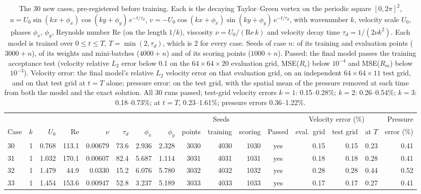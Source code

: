 \begin{table}[tb]
\centering
\footnotesize
\setlength{\tabcolsep}{4pt}
\caption{The 30 new cases, pre-registered before training. Each is the decaying Taylor--Green vortex on the periodic square $[0, 2\pi]^2$, $u = U_0 \sin(kx + \phi_x)\cos(ky + \phi_y)\,e^{-t/\tau_d}$, $v = -U_0 \cos(kx + \phi_x)\sin(ky + \phi_y)\,e^{-t/\tau_d}$, with wavenumber $k$, velocity scale $U_0$, phases $\phi_x$, $\phi_y$, Reynolds number Re (on the length $1/k$), viscosity $\nu = U_0/(\mathrm{Re}\,k)$ and velocity decay time $\tau_d = 1/(2\nu k^2)$. Each model is trained over $0 \le t \le T$, $T = \min(2, \tau_d)$, which is 2 for every case. Seeds of case $n$: of its training and evaluation points ($3000 + n$), of its weights and mini-batches ($4000 + n$) and of its scoring points ($1000 + n$). Passed: the final model passes the training acceptance test (velocity relative $L_2$ error below 0.1 on the $64\times64\times20$ evaluation grid, MSE($R_c$) below $10^{-4}$ and MSE($R_m$) below $10^{-3}$). Velocity error: the final model's relative $L_2$ velocity error on that evaluation grid, on an independent $64\times64\times11$ test grid, and on that test grid at $t = T$ alone; pressure error: on the test grid, with the spatial mean of the pressure removed at each time from both the model and the exact solution. All 30 runs passed; test-grid velocity errors $k = 1$: 0.15--0.28\%; $k = 2$: 0.26--0.54\%; $k = 3$: 0.18--0.73\%; at $t = T$, 0.23--1.61\%; pressure errors 0.36--1.22\%.}
\label{tab:cases}
\begin{tabular}{lrrrrrrrrrrcrrrr}
\toprule
 &  &  &  &  &  &  &  & \multicolumn{3}{c}{Seeds} & & \multicolumn{3}{c}{Velocity error (\%)} & Pressure \\
\cmidrule(lr){9-11} \cmidrule(lr){13-15}
Case & $k$ & $U_0$ & Re & $\nu$ & $\tau_d$ & $\phi_x$ & $\phi_y$ & points & training & scoring & Passed & eval.\ grid & test grid & at $T$ & error (\%) \\
\midrule
30 & 1 & 0.768 & 113.1 & 0.00679 & 73.6 & 2.936 & 2.328 & 3030 & 4030 & 1030 & yes & 0.15 & 0.15 & 0.23 & 0.41 \\
31 & 1 & 1.032 & 170.1 & 0.00607 & 82.4 & 5.687 & 1.114 & 3031 & 4031 & 1031 & yes & 0.18 & 0.18 & 0.28 & 0.41 \\
32 & 1 & 1.479 & 44.9 & 0.0330 & 15.2 & 6.076 & 5.780 & 3032 & 4032 & 1032 & yes & 0.28 & 0.28 & 0.44 & 0.52 \\
33 & 1 & 1.454 & 153.6 & 0.00947 & 52.8 & 3.237 & 5.189 & 3033 & 4033 & 1033 & yes & 0.17 & 0.17 & 0.27 & 0.41 \\

\end{tabular}
\end{table}
